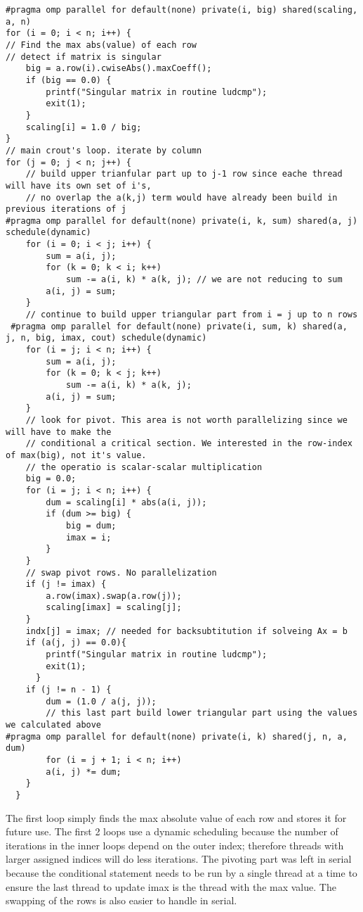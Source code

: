 \documentclass[12pt,letterpaper]{article}
\begin{document}
     \begin{lstlisting}
#pragma omp parallel for default(none) private(i, big) shared(scaling, a, n)
for (i = 0; i < n; i++) {
// Find the max abs(value) of each row
// detect if matrix is singular
    big = a.row(i).cwiseAbs().maxCoeff();
    if (big == 0.0) {
        printf("Singular matrix in routine ludcmp");
        exit(1);
    }
    scaling[i] = 1.0 / big;
}
// main crout's loop. iterate by column
for (j = 0; j < n; j++) {
    // build upper trianfular part up to j-1 row since eache thread will have its own set of i's,
    // no overlap the a(k,j) term would have already been build in previous iterations of j
#pragma omp parallel for default(none) private(i, k, sum) shared(a, j) schedule(dynamic)
  	for (i = 0; i < j; i++) {
  		sum = a(i, j);
  		for (k = 0; k < i; k++)
  			sum -= a(i, k) * a(k, j); // we are not reducing to sum
  		a(i, j) = sum;
  	}
  	// continue to build upper triangular part from i = j up to n rows
 #pragma omp parallel for default(none) private(i, sum, k) shared(a, j, n, big, imax, cout) schedule(dynamic)
  	for (i = j; i < n; i++) {
  		sum = a(i, j);
  		for (k = 0; k < j; k++)
  			sum -= a(i, k) * a(k, j);
  		a(i, j) = sum;
  	}
  	// look for pivot. This area is not worth parallelizing since we will have to make the
  	// conditional a critical section. We interested in the row-index of max(big), not it's value.
  	// the operatio is scalar-scalar multiplication
  	big = 0.0;
  	for (i = j; i < n; i++) {
  		dum = scaling[i] * abs(a(i, j));
  		if (dum >= big) {
  			big = dum;
  			imax = i;
  		}
  	}
  	// swap pivot rows. No parallelization
  	if (j != imax) {
  		a.row(imax).swap(a.row(j));
  		scaling[imax] = scaling[j];
  	}
  	indx[j] = imax; // needed for backsubtitution if solveing Ax = b
  	if (a(j, j) == 0.0){
        printf("Singular matrix in routine ludcmp");
        exit(1);
      }
  	if (j != n - 1) {
  		dum = (1.0 / a(j, j));
  		// this last part build lower triangular part using the values we calculated above
#pragma omp parallel for default(none) private(i, k) shared(j, n, a, dum)
  		for (i = j + 1; i < n; i++)
  		a(i, j) *= dum;
  	}
  }
    \end{lstlisting}

The first loop simply finds the max absolute value of each row and stores it for future use. The first 2 loops use a dynamic scheduling because the number of iterations in the inner loops depend on the outer index; therefore threads with larger assigned indices will do less iterations. The pivoting part was left in serial because the conditional statement needs to be run by a single thread at a time to ensure the last thread to update imax is the thread with the max value. The swapping of the rows is also easier to handle in serial.
\end{document}
